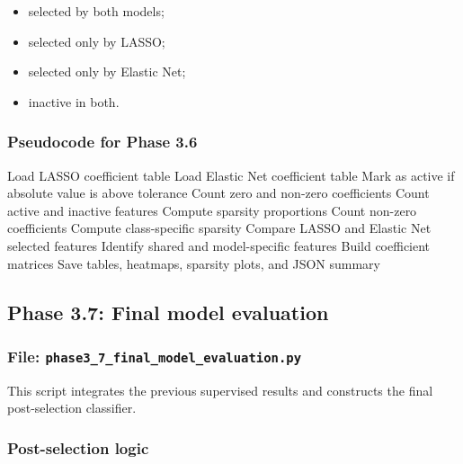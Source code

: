 \documentclass{ipgpmaster}
\begin{document}
\begin{itemize}
    \item selected by both models;
    \item selected only by LASSO;
    \item selected only by Elastic Net;
    \item inactive in both.
\end{itemize}

\subsubsection{Pseudocode for Phase 3.6}

\begin{algorithm}[H]
\caption{Phase 3.6: Sparsity analysis}
\begin{algorithmic}[1]
\State Load LASSO coefficient table
\State Load Elastic Net coefficient table
    \State Mark as active if absolute value is above tolerance
\EndFor
{}
    \State Count zero and non-zero coefficients
    \State Count active and inactive features
    \State Compute sparsity proportions
\EndFor
{}
    \State Count non-zero coefficients
    \State Compute class-specific sparsity
\EndFor
\State Compare LASSO and Elastic Net selected features
\State Identify shared and model-specific features
\State Build coefficient matrices
\State Save tables, heatmaps, sparsity plots, and JSON summary
\end{algorithmic}
\end{algorithm}

\subsection{Phase 3.7: Final model evaluation}

\subsubsection{File: \texttt{phase3\_7\_final\_model\_evaluation.py}}

This script integrates the previous supervised results and constructs the final post-selection classifier.

\subsubsection{Post-selection logic}
\end{document}
